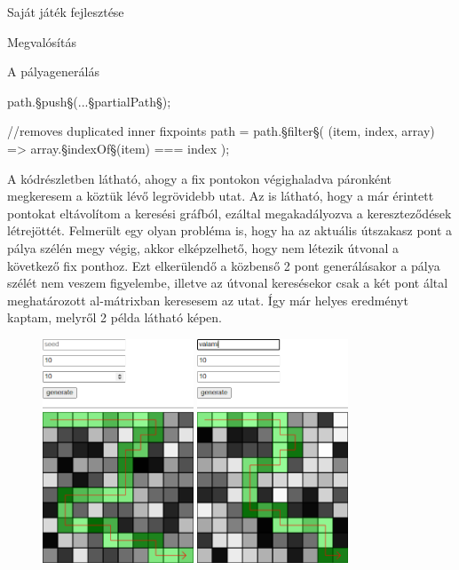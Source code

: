 \begin{MyChapter}{Saját játék fejlesztése}
\begin{MySection}{Megvalósítás}
\begin{MySubSection}{A pályagenerálás}
\begin{javascript}
{	path.§\color{jsMethod}push§(...§\color{jsConst}partialPath§);
}

//removes duplicated inner fixpoints
path = path.§\color{jsMethod}filter§(
	(item, index, array) => array.§\color{jsMethod}indexOf§(item) === index
);
			\end{javascript}
			A kódrészletben látható, ahogy a fix pontokon végighaladva páronként megkeresem a köztük lévő legrövidebb utat. Az is látható, hogy a már érintett pontokat eltávolítom a keresési gráfból, ezáltal megakadályozva a kereszteződések létrejöttét. Felmerült egy olyan probléma is, hogy ha az aktuális útszakasz pont a pálya szélén megy végig, akkor elképzelhető, hogy nem létezik útvonal a következő fix ponthoz. Ezt elkerülendő a közbenső 2 pont generálásakor a pálya szélét nem veszem figyelembe, illetve az útvonal keresésekor csak a két pont által meghatározott al-mátrixban keresesem az utat. Így már helyes eredményt kaptam, melyről 2 példa látható  képen.
			
			\begin{figure}[H]
				\centering
				\includegraphics[width=0.4\textwidth]{kepek/map/generate-example-1.png}
				\hspace{5mm}
				\includegraphics[width=0.4\textwidth]{kepek/map/generate-example-2.png}
				

\end{figure}
\end{MySubSection}
\end{MySection}
\end{MyChapter}
